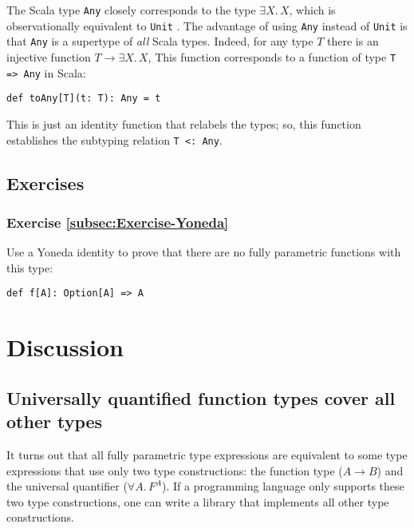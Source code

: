 The Scala type \lstinline!Any!
closely corresponds to the type $\exists X.\,X$, which is observationally
equivalent to \lstinline!Unit!
. The advantage of using \lstinline!Any!
instead of \lstinline!Unit!
is that \lstinline!Any!
is a supertype of \emph{all} Scala types. Indeed, for any type $T$
there is an injective function $T\rightarrow\exists X.\,X$, This
function corresponds to a function of type \lstinline!T => Any!
in Scala:
\begin{lstlisting}
def toAny[T](t: T): Any = t
\end{lstlisting}
 This is just an identity function that relabels the types; so, this
function establishes the subtyping relation \lstinline!T <: Any!.

\subsection{Exercises}

\subsubsection{Exercise \label{subsec:Exercise-Yoneda}\ref{subsec:Exercise-Yoneda}}

Use a Yoneda identity to prove that there are no fully parametric
functions with this type:

\begin{lstlisting}
def f[A]: Option[A] => A
\end{lstlisting}

\section{Discussion}

\subsection{Universally quantified function types cover all other types}

It turns out that all fully parametric type expressions are equivalent
to some type expressions that use only two type constructions: the
function type ($A\rightarrow B$) and the universal quantifier ($\forall A.\,F^{A}$).
If a programming language only supports these two type constructions,
one can write a library that implements all other type constructions.

